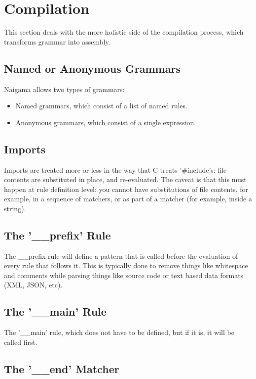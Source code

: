 \section{Compilation}

This section deals with the more holistic side of the compilation process,
which transforms grammar into assembly.

\subsection{Named or Anonymous Grammars}

Naigama allows two types of grammars:

\begin{itemize}
\item Named grammars, which consist of a list of named rules.
\item Anonymous grammars, which consist of a single expression.
\end{itemize}

\subsection{Imports}

Imports are treated more or less in the way that C treats '\#include's:
file contents are substituted in place, and re-evaluated. The caveat
is that this must happen at rule definition level: you cannot have
substitutions of file contents, for example, in a sequence of matchers,
or as part of a matcher (for example, inside a string).

\subsection{The '\_\_prefix' Rule}

The \_\_prefix rule will define a pattern that is called before
the evaluation of every rule that follows it. This is typically
done to remove things like whitespace and comments while parsing
things like source code or text based data formats (XML, JSON, etc).

\subsection{The '\_\_main' Rule}

The '\_\_main' rule, which does not have to be defined, but if it is,
it will be called first.

\subsection{The '\_\_end' Matcher}

